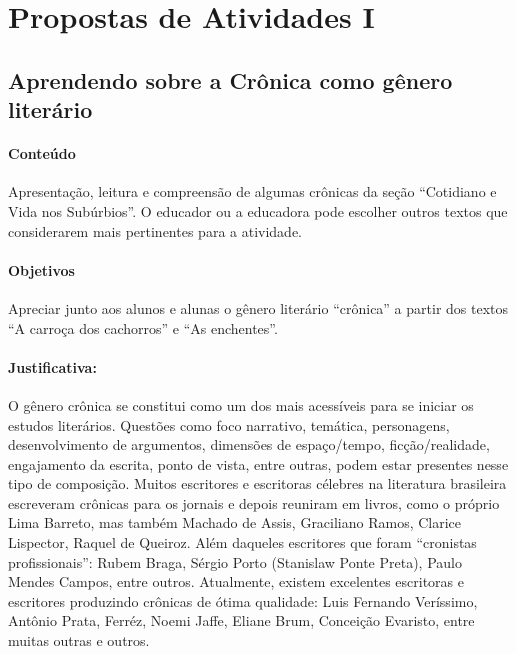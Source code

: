 \documentclass[11pt]{extarticle}
\begin{document}
\section{Propostas de Atividades I}


\subsection{Aprendendo sobre a Crônica como gênero literário}



\paragraph{Conteúdo} Apresentação, leitura e compreensão de algumas
crônicas da seção ``Cotidiano e Vida nos Subúrbios''. O educador ou a
educadora pode escolher outros textos que considerarem mais pertinentes
para a atividade.


\paragraph{Objetivos} Apreciar junto aos alunos e alunas o gênero
literário ``crônica'' a partir dos textos ``A carroça dos
cachorros'' e ``As enchentes''.


\paragraph{Justificativa:} O gênero crônica se constitui como um dos mais
acessíveis para se iniciar os estudos literários. Questões como foco
narrativo, temática, personagens, desenvolvimento de argumentos,
dimensões de espaço/tempo, ficção/realidade, engajamento da escrita,
ponto de vista, entre outras, podem estar presentes nesse tipo de
composição. Muitos escritores e escritoras célebres na literatura
brasileira escreveram crônicas para os jornais e depois reuniram em
livros, como o próprio Lima Barreto, mas também Machado de Assis,
Graciliano Ramos, Clarice Lispector, Raquel de Queiroz. Além daqueles
escritores que foram ``cronistas profissionais'': Rubem Braga, Sérgio
Porto (Stanislaw Ponte Preta), Paulo Mendes Campos, entre outros.
Atualmente, existem excelentes escritoras e escritores produzindo
crônicas de ótima qualidade: Luis Fernando Veríssimo, Antônio Prata,
Ferréz, Noemi Jaffe, Eliane Brum, Conceição Evaristo, entre muitas
outras e outros.
\end{document}
